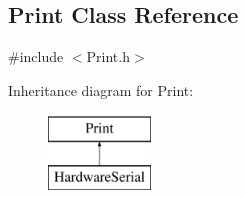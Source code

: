 \hypertarget{class_print}{
\subsection{Print Class Reference}
\label{class_print}
}


{\ttfamily \#include $<$Print.h$>$}

Inheritance diagram for Print:\begin{figure}[H]
\begin{center}
\leavevmode
\includegraphics[height=2.000000cm]{class_print}
\end{center}
\end{figure}
